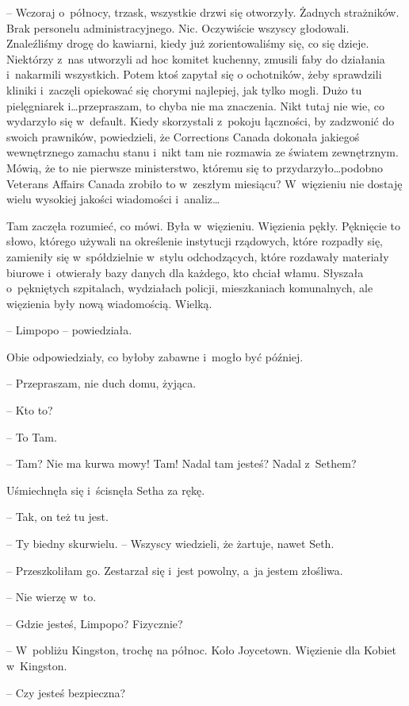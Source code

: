 \documentclass[oneside,polish,11pt,sfheadings]{mwbk}
\begin{document}
-- Wczoraj o~północy, trzask, wszystkie drzwi się otworzyły. Żadnych
strażników. Brak personelu administracyjnego. Nic. Oczywiście wszyscy
głodowali. Znaleźliśmy drogę do kawiarni, kiedy już zorientowaliśmy się,
co się dzieje. Niektórzy z~nas utworzyli ad hoc komitet kuchenny,
zmusili faby do działania i~nakarmili wszystkich. Potem ktoś zapytał się
o ochotników, żeby sprawdzili kliniki i~zaczęli opiekować się chorymi
najlepiej, jak tylko mogli. Dużo tu pielęgniarek i\ldots  przepraszam, to
chyba nie ma znaczenia. Nikt tutaj nie wie, co wydarzyło się w~default.
Kiedy skorzystali z~pokoju łączności, by zadzwonić do swoich prawników,
powiedzieli, że Corrections Canada dokonała jakiegoś wewnętrznego
zamachu stanu i~nikt tam nie rozmawia ze światem zewnętrznym. Mówią, że
to nie pierwsze ministerstwo, któremu się to przydarzyło\ldots  podobno
Veterans Affairs Canada zrobiło to w~zeszłym miesiącu? W~więzieniu nie
dostaję wielu wysokiej jakości wiadomości i~analiz\ldots 

Tam zaczęła rozumieć, co mówi. Była w~więzieniu. Więzienia pękły.
Pęknięcie to słowo, którego używali na określenie instytucji rządowych,
które rozpadły się, zamieniły się w~spółdzielnie w~stylu odchodzących,
które rozdawały materiały biurowe i~otwierały bazy danych dla każdego,
kto chciał włamu. Słyszała o~pękniętych szpitalach, wydziałach policji,
mieszkaniach komunalnych, ale więzienia były nową wiadomością. Wielką.

-- Limpopo -- powiedziała.

Obie odpowiedziały, co byłoby zabawne i~mogło być później.

-- Przepraszam, nie duch domu, żyjąca.

-- Kto to?

-- To Tam.

-- Tam? Nie ma kurwa mowy! Tam! Nadal tam jesteś? Nadal z~Sethem?

Uśmiechnęła się i~ścisnęła Setha za rękę.

-- Tak, on też tu jest.

-- Ty biedny skurwielu. -- Wszyscy wiedzieli, że żartuje, nawet Seth.

-- Przeszkoliłam go. Zestarzał się i~jest powolny, a~ja jestem złośliwa.

-- Nie wierzę w~to.

-- Gdzie jesteś, Limpopo? Fizycznie?

-- W~pobliżu Kingston, trochę na północ. Koło Joycetown. Więzienie dla
Kobiet w~Kingston.

-- Czy jesteś bezpieczna?
\end{document}
